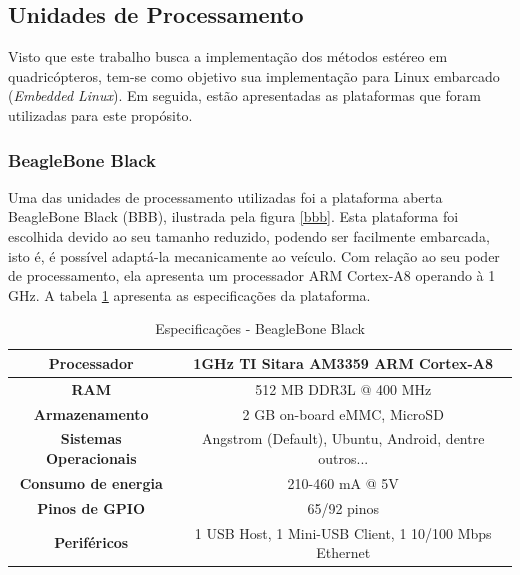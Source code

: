 \subsection{Unidades de Processamento}

Visto que este trabalho busca a implementação dos métodos estéreo em quadricópteros, tem-se como objetivo sua implementação para Linux embarcado (\textit{Embedded Linux}). Em seguida, estão apresentadas as plataformas que foram utilizadas para este propósito.


\subsubsection{BeagleBone Black}

Uma das unidades de processamento utilizadas foi a plataforma aberta BeagleBone Black (BBB), ilustrada pela figura \ref{bbb}. Esta plataforma foi escolhida devido ao seu tamanho reduzido, podendo ser facilmente embarcada, isto é, é possível adaptá-la mecanicamente ao veículo. Com relação ao seu poder de processamento, ela apresenta um processador ARM Cortex-A8 operando à 1 GHz. A tabela \ref{bbb_tab} apresenta as especificações da plataforma.

\begin{table}[]
\centering
\caption{Especificações - BeagleBone Black}
\label{bbb_tab}
\begin{tabular}{|c|c|}
\hline
\textbf{Processador}           & 1GHz TI Sitara AM3359 ARM Cortex-A8			\\	\hline
\textbf{RAM}                   & 512 MB DDR3L @ 400 MHz					\\	\hline
\textbf{Armazenamento}         & 2 GB on-board eMMC, MicroSD				\\	\hline
\textbf{Sistemas Operacionais} & Angstrom (Default), Ubuntu, Android, dentre outros...	\\	\hline
\textbf{Consumo de energia}    & 210-460 mA @ 5V					\\	\hline
\textbf{Pinos de GPIO}         & 65/92 pinos						\\	\hline
\textbf{Periféricos}           & 1 USB Host, 1 Mini-USB Client, 1 10/100 Mbps Ethernet  \\	\hline                              
\end{tabular}
\end{table}

